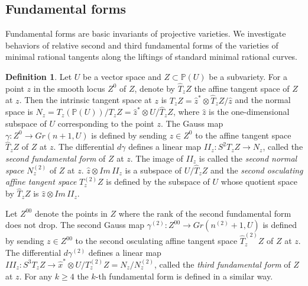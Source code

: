 \documentclass[12pt]{amsart}
\theoremstyle{plain}
\theoremstyle{definition}
\newtheorem{definition} [theorem] {Definition}
\begin{document}
\subsection{Fundamental forms}
Fundamental forms are basic invariants of projective varieties. We investigate behaviors of relative second and third fundamental forms of the varieties of minimal rational tangents along the liftings of standard minimal rational curves.
\begin{definition}
Let $U$ be a vector space and $Z \subset \mathbb P(U)$ be a subvariety. For a point $z$ in the smooth locus $Z^0$ of $Z$, denote by $\widehat T_zZ$ the affine tangent space of $Z$ at $z$. Then the intrinsic tangent space  at $z$ is $T_zZ=\widehat z ^* \otimes  \widehat T_zZ/\widehat z$ and the normal space is $N_z = T_z(\mathbb P(U))/T_zZ = \widehat z^* \otimes U/\widehat T_zZ$, where $\widehat z$ is the one-dimensional subspace of $U$ corresponding to the point $z$. The Gauss map $\gamma: Z^0 \rightarrow Gr(n+1, U)$ is defined by sending $z \in Z^0$ to the affine tangent space $\widehat T_zZ$ of $Z$ at $z$.  The differential $d \gamma$ defines a linear map $II_z:S^2T_zZ \rightarrow N_z$, called the {\it second fundamental form} of $Z$ at $z$. The image of $II_z$ is called the {\it second normal space} $N^{(2)}_z$ of $Z$ at $z$. $\widehat z \otimes Im\, II_z$ is a subspace of $U/\widehat T_zZ$ and the {\it second osculating affine tangent space} $T^{(2)}_zZ$ is defined by the subspace of $U$ whose quotient space by $\widehat T_zZ$ is   $\widehat z \otimes  Im \,II_z $.

Let $Z^{00}$ denote the points in $Z$ where the rank of the second fundamental form does not drop.
  The second Gauss map $\gamma^{(2)}: Z^{00} \rightarrow Gr(n^{(2)}+1, U)$ is defined by sending $z \in Z^{00}$ to the second osculating affine tangent space $\widehat T^{(2)}_zZ$ of $Z$ at $z$.  The differential $d \gamma^{(2)}$ defines a linear map $III_z:S^3T_zZ \rightarrow \widehat x^* \otimes U/T^{(2)}_zZ = N_z/N^{(2)}_z$, called the {\it third fundamental form}  of $Z$ at $z$. For any $k \geq 4$ the $k$-th fundamental form is defined in a similar way.
\end{definition}
\end{document}

